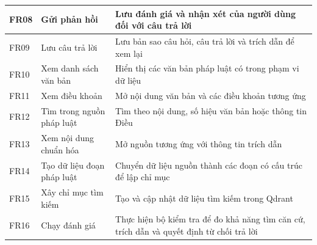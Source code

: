 \documentclass[12pt,a4paper,oneside]{report}
\begin{document}
\begin{longtable}{|L{1.4cm}|L{4.6cm}|L{8.5cm}|}
  \hline
  FR08        & Gửi phản hồi                           & Lưu đánh giá và nhận xét của người dùng đối với câu trả lời                                                                                                                                            \\
  \hline
  FR09        & Lưu câu trả lời                        & Lưu bản sao câu hỏi, câu trả lời và trích dẫn để xem lại                                                                                                                                               \\
  \hline
  FR10        & Xem danh sách văn bản                  & Hiển thị các văn bản pháp luật có trong phạm vi dữ liệu                                                                                                                                                \\
  \hline
  FR11        & Xem điều khoản                         & Mở nội dung văn bản và các điều khoản tương ứng                                                                                                                                                        \\
  \hline
  FR12        & Tìm trong nguồn pháp luật              & Tìm theo nội dung, số hiệu văn bản hoặc thông tin Điều                                                                                                                                                 \\
  \hline
  FR13        & Xem nội dung chuẩn hóa                 & Mở nguồn tương ứng với thông tin trích dẫn                                                                                                                                                             \\
  \hline
  FR14        & Tạo dữ liệu đoạn pháp luật             & Chuyển dữ liệu nguồn thành các đoạn có cấu trúc để lập chỉ mục                                                                                                                                         \\
  \hline
  FR15        & Xây chỉ mục tìm kiếm                   & Tạo và cập nhật dữ liệu tìm kiếm trong Qdrant                                                                                                                                                          \\
  \hline
  FR16        & Chạy đánh giá                          & Thực hiện bộ kiểm tra để đo khả năng tìm căn cứ, trích dẫn và quyết định từ chối trả lời                                                                                                               \\
  \hline
\end{longtable}
\end{document}
